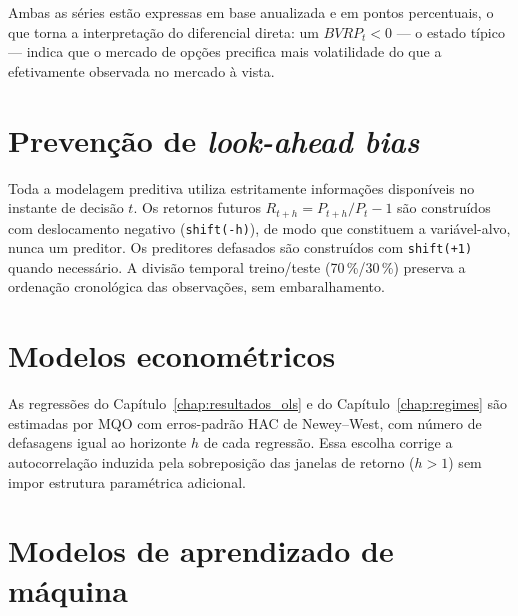 Ambas as séries estão expressas em base anualizada e em pontos percentuais, o
que torna a interpretação do diferencial direta: um $BVRP_t < 0$ --- o estado típico --- indica que o
mercado de opções precifica mais volatilidade do que a efetivamente observada
no mercado à vista.

\section*{Prevenção de \textit{look-ahead bias}}

Toda a modelagem preditiva utiliza estritamente informações disponíveis no
instante de decisão $t$. Os retornos futuros
$R_{t+h} = P_{t+h}/P_t - 1$ são construídos com deslocamento negativo
(\texttt{shift(-h)}), de modo que constituem a variável-alvo, nunca um preditor.
Os preditores defasados são construídos com \texttt{shift(+1)} quando necessário.
A divisão temporal treino/teste (70\,\%/30\,\%) preserva a ordenação
cronológica das observações, sem embaralhamento.

\section*{Modelos econométricos}

As regressões do Capítulo~\ref{chap:resultados_ols} e do
Capítulo~\ref{chap:regimes} são estimadas por MQO com erros-padrão HAC de
Newey--West, com número de defasagens igual ao horizonte $h$ de cada regressão.
Essa escolha corrige a autocorrelação induzida pela sobreposição das janelas de
retorno ($h > 1$) sem impor estrutura paramétrica adicional.

\section*{Modelos de aprendizado de máquina}

